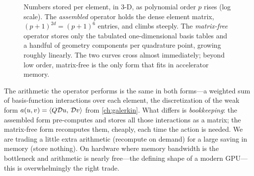 \begin{figure}[t]
\centering
{}
\caption[Memory: assembled versus matrix-free]{Numbers stored per element, in
3-D, as polynomial order $p$ rises (log scale). The \emph{assembled} operator
holds the dense element matrix, $(p+1)^{2d}=(p+1)^6$ entries, and climbs
steeply. The \emph{matrix-free} operator stores only the tabulated
one-dimensional basis tables and a handful of geometry components per quadrature
point, growing roughly linearly. The two curves cross almost immediately;
beyond low order, matrix-free is the only form that fits in accelerator memory.}
\label{fig:mf-cost}
\end{figure}

\begin{physicsbox}
The arithmetic the operator performs is the same in both forms---a weighted sum
of basis-function interactions over each element, the discretization of the weak
form $a(u,v)=\left\langle Q\mathcal{D} u,\, \mathcal{D} v\right\rangle$ from \cref{ch:galerkin}. What
differs is \emph{bookkeeping}: the assembled form pre-computes and stores all
those interactions as a matrix; the matrix-free form recomputes them, cheaply,
each time the action is needed. We are trading a little extra arithmetic
(recompute on demand) for a large saving in memory (store nothing). On hardware
where memory bandwidth is the bottleneck and arithmetic is nearly free---the
defining shape of a modern GPU---this is overwhelmingly the right trade.
\end{physicsbox}

